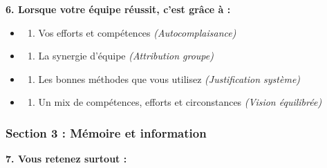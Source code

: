 \documentclass[
]{article}
\providecommand{\tightlist}{%
  \setlength{\itemsep}{0pt}\setlength{\parskip}{0pt}}
\begin{document}
\textbf{6. Lorsque votre équipe réussit, c'est grâce à :}

\begin{itemize}
\tightlist
\item
  \begin{enumerate}
  \def\labelenumi{\alph{enumi})}
  \tightlist
  \item
    Vos efforts et compétences \emph{(Autocomplaisance)}
  \end{enumerate}
\item
  \begin{enumerate}
  \def\labelenumi{\alph{enumi})}
  \setcounter{enumi}{1}
  \tightlist
  \item
    La synergie d'équipe \emph{(Attribution groupe)}
  \end{enumerate}
\item
  \begin{enumerate}
  \def\labelenumi{\alph{enumi})}
  \setcounter{enumi}{2}
  \tightlist
  \item
    Les bonnes méthodes que vous utilisez \emph{(Justification système)}
  \end{enumerate}
\item
  \begin{enumerate}
  \def\labelenumi{\alph{enumi})}
  \setcounter{enumi}{3}
  \tightlist
  \item
    Un mix de compétences, efforts et circonstances \emph{(Vision
    équilibrée)}
  \end{enumerate}
\end{itemize}

\subsubsection{Section 3 : Mémoire et
information}\label{section-3-muxe9moire-et-information}

\textbf{7. Vous retenez surtout :}
\end{document}

